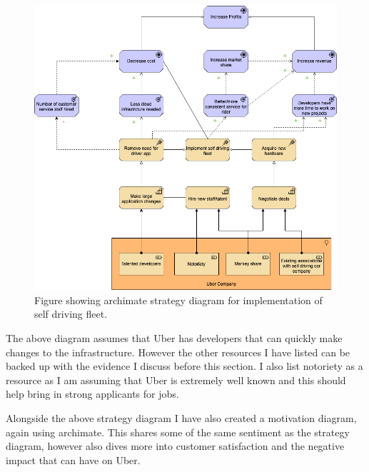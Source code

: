 \documentclass{article}
\begin{document}
    \begin{figure}[H]
      \centering
      \captionsetup{justification=centering}
      \includegraphics[width=12cm]{assets/strategy.drawio.png}
      \caption{Figure showing archimate strategy diagram for implementation of self driving fleet.}
      \label{fig:strategyDiagram}
    \end{figure}

    The above diagram assumes that Uber has developers that can quickly make changes to the infrastructure. However the other resources I have listed
    can be backed up with the evidence I discuss before this section. I also list notoriety as a resource as I am assuming that Uber is extremely well
    known and this should help bring in strong applicants for jobs.

    \newpage

    \noindent Alongside the above strategy diagram I have also created a motivation diagram, again using archimate. This shares some of the same sentiment 
    as the strategy diagram, however also dives more into customer satisfaction and the negative impact that can have on Uber.
\end{document}

